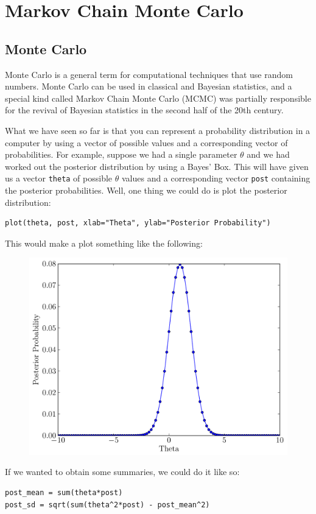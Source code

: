 \chapter{Markov Chain Monte Carlo}
\section{Monte Carlo}
Monte Carlo is a general term for computational techniques that use random
numbers.
Monte Carlo can be used in classical and Bayesian statistics, and a special kind
called Markov Chain Monte Carlo (MCMC) was partially responsible for the revival
of Bayesian statistics in the second half of the 20th century.

What we have seen so far is that you can represent a probability distribution
in a computer by using a vector of possible values and a corresponding
vector of probabilities. For example, suppose we had a single parameter $\theta$
and we had worked out the posterior distribution by using a Bayes' Box. This
will have given us a vector {\tt theta} of possible $\theta$ values and a corresponding
vector {\tt post} containing the posterior probabilities. Well, one thing we could
do is plot the posterior distribution:
\begin{verbatim}
plot(theta, post, xlab="Theta", ylab="Posterior Probability")
\end{verbatim}
This would make a plot something like the following:
\begin{figure}[ht!]
\begin{center}
\includegraphics[scale=0.5]{Figures/normal.pdf}
\caption{\label{fig:normal}}
\end{center}
\end{figure}
If we wanted to obtain some summaries, we could do it like so:
\begin{verbatim}
post_mean = sum(theta*post)
post_sd = sqrt(sum(theta^2*post) - post_mean^2)
\end{verbatim}


